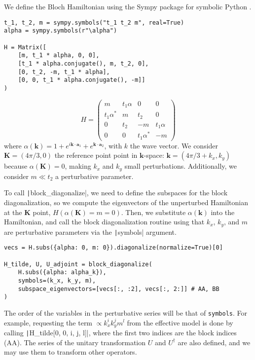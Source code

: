 We define the Bloch Hamiltonian using the Sympy package for symbolic Python
\cite{Meurer_2017}.
%
\begin{verbatim}
t_1, t_2, m = sympy.symbols("t_1 t_2 m", real=True)
alpha = sympy.symbols(r"\alpha")

H = Matrix([
    [m, t_1 * alpha, 0, 0],
    [t_1 * alpha.conjugate(), m, t_2, 0],
    [0, t_2, -m, t_1 * alpha],
    [0, 0, t_1 * alpha.conjugate(), -m]]
)
\end{verbatim}

$$
H =
\begin{pmatrix}
m & t_1 \alpha & 0 & 0\\
t_1 \alpha^{*} & m & t_2 & 0\\
0 & t_2 & -m & t_1 \alpha\\
0 & 0 & t_1 \alpha^{*} & -m
\end{pmatrix}
$$
%
where $\alpha(\mathbf{k}) = 1 + e^{i \mathbf{k} \cdot \mathbf{a}_1} + e^{\mathbf{k} \cdot
\mathbf{a}_2}$, with $k$ the wave vector.
We consider $\mathbf{K}=(4\pi/3, 0)$ the reference point point in $\mathbf{k}$-space:
$\mathbf{k} = (4\pi/3 + k_x, k_y)$ because $\alpha(\mathbf{K}) = 0$, making
$k_x$ and $k_y$ small perturbations.
Additionally, we consider $m \ll t_2$ a perturbative parameter.

To call \texttt|block_diagonalize|, we need to define the subspaces
for the block diagonalization, so we compute the eigenvectors of the
unperturbed Hamiltonian at the $\mathbf{K}$ point, $H(\alpha(\mathbf{K}) = m =
0)$.
Then, we substitute $\alpha(\mathbf{k})$ into the Hamiltonian, and call the
block diagonalization routine using that $k_x$, $k_y$, and $m$ are perturbative
parameters via the \texttt|symbols| argument.
%
\begin{verbatim}
vecs = H.subs({alpha: 0, m: 0}).diagonalize(normalize=True)[0]

H_tilde, U, U_adjoint = block_diagonalize(
    H.subs({alpha: alpha_k}),
    symbols=(k_x, k_y, m),
    subspace_eigenvectors=[vecs[:, :2], vecs[:, 2:]] # AA, BB
)
\end{verbatim}
%
The order of the variables in the perturbative series will be that of
\texttt{symbols}.
For example, requesting the term $\propto k_x^{i} k_y^{j} m^{l}$ from the
effective model is done by calling \texttt|H_tilde[0, 0, i, j, l]|,
where the first two indices are the block indices (AA).
The series of the unitary transformation $U$ and $U^\dagger$ are also defined,
and we may use them to transform other operators.


